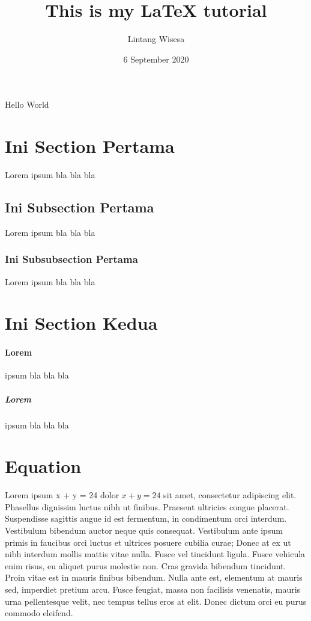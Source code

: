 \documentclass{article}
\title{This is my LaTeX tutorial} %
\author{Lintang Wisesa}           %
\date{6 September 2020}           %
\begin{document}
    \doublespacing
    \tableofcontents

    \newpage
    \listoffigures
    \listoftables

    \maketitle
    Hello World

    \newpage
    
    \section{Ini Section Pertama}
    Lorem ipsum bla bla bla
    \subsection{Ini Subsection Pertama}
    Lorem ipsum bla bla bla
    \subsubsection{Ini Subsubsection Pertama}
    Lorem ipsum bla bla bla

    \section{Ini Section Kedua}
    \paragraph{Lorem}
    ipsum bla bla bla
        \subparagraph{Lorem}
        ipsum bla bla bla

    \section{Equation}
    Lorem ipsum x + y = 24 dolor $x + y = 24$ sit amet, consectetur adipiscing elit. Phasellus dignissim luctus nibh ut finibus. Praesent ultricies congue placerat. Suspendisse sagittis augue id est fermentum, in condimentum orci interdum. Vestibulum bibendum auctor neque quis consequat. Vestibulum ante ipsum primis in faucibus orci luctus et ultrices posuere cubilia curae; Donec at ex ut nibh interdum mollis mattis vitae nulla. Fusce vel tincidunt ligula. Fusce vehicula enim risus, eu aliquet purus molestie non. Cras gravida bibendum tincidunt. Proin vitae est in mauris finibus bibendum. Nulla ante est, elementum at mauris sed, imperdiet pretium arcu. Fusce feugiat, massa non facilisis venenatis, mauris urna pellentesque velit, nec tempus tellus eros at elit. Donec dictum orci eu purus commodo eleifend.
    
\end{document}
